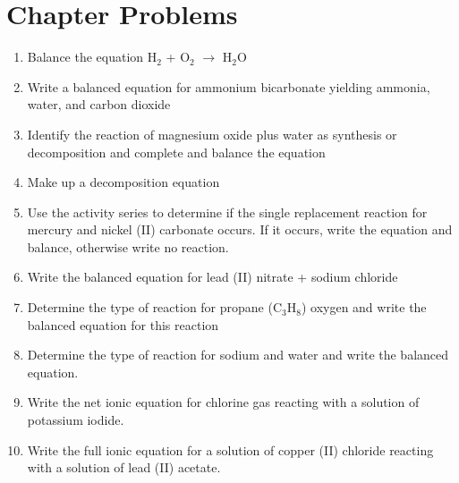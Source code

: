 \documentclass[../hchem.tex]{subfiles}
\begin{document}
\section*{Chapter Problems}
\begin{enumerate}
    \item Balance the equation H$_2$ + O$_2$ $\rightarrow$ H$_2$O
    \item Write a balanced equation for ammonium bicarbonate yielding ammonia, water, and carbon dioxide 
    \item Identify the reaction of magnesium oxide plus water as synthesis or decomposition and complete and balance the equation 
    \item Make up a decomposition equation 
    \item Use the activity series to determine if the single replacement reaction for mercury and nickel (II) carbonate occurs. If it occurs, write the equation and balance, otherwise write no reaction.
    \item Write the balanced equation for lead (II) nitrate + sodium chloride 
    \item Determine the type of reaction for propane (C$_3$H$_8$) oxygen and write the balanced equation for this reaction 
    \item Determine the type of reaction for sodium and water and write the balanced equation.
    \item Write the net ionic equation for chlorine gas reacting with a solution of potassium iodide.
    \item Write the full ionic equation for a solution of copper (II) chloride reacting with a solution of lead (II) acetate.
\end{enumerate}
\end{document}
